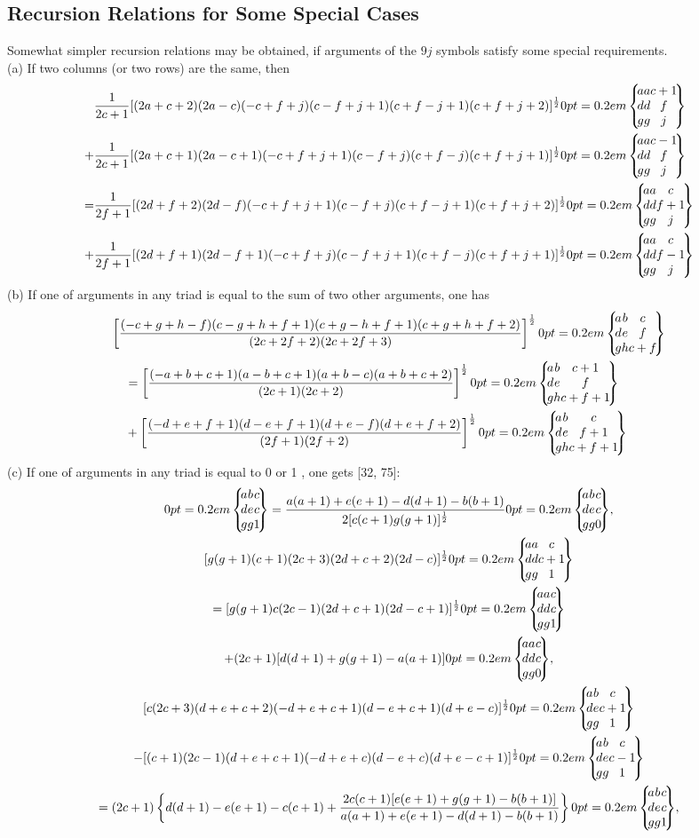 \subsection{Recursion Relations for Some Special Cases}\label{sec:10.5.5}
Somewhat simpler recursion relations may be obtained, if arguments of the $9 j$ symbols satisfy some special requirements.\\
(a) If two columns (or two rows) are the same, then
\begin{align}
& \frac{1}{2 c+1}[(2 a+c+2)(2 a-c)(-c+f+j)(c-f+j+1)(c+f-j+1)(c+f+j+2)]^{\frac{1}{2}}\ninej{a}{a}{c+1}{d}{d}{f}{g}{g}{j}  \notag\\
+ & \frac{1}{2 c+1}[(2 a+c+1)(2 a-c+1)(-c+f+j+1)(c-f+j)(c+f-j)(c+f+j+1)]^{\frac{1}{2}}\ninej{a}{a}{c-1}{d}{d}{f}{g}{g}{j}  \notag\\
= & \frac{1}{2 f+1}[(2 d+f+2)(2 d-f)(-c+f+j+1)(c-f+j)(c+f-j+1)(c+f+j+2)]^{\frac{1}{2}}\ninej{a}{a}{c}{d}{d}{f+1}{g}{g}{j}  \notag\\
+ & \frac{1}{2 f+1}[(2 d+f+1)(2 d-f+1)(-c+f+j)(c-f+j+1)(c+f-j)(c+f+j+1)]^{\frac{1}{2}}\ninej{a}{a}{c}{d}{d}{f-1}{g}{g}{j} \label{eq:10:5:11}
\end{align}
(b) If one of arguments in any triad is equal to the sum of two other arguments, one has \cite{ref045}
\begin{align}
& {\left[\frac{(-c+g+h-f)(c-g+h+f+1)(c+g-h+f+1)(c+g+h+f+2)}{(2 c+2 f+2)(2 c+2 f+3)}\right]^{\frac{1}{2}}\ninej{a}{b}{c}{d}{e}{f}{g}{h}{c+f}}  \notag\\
& \quad=\left[\frac{(-a+b+c+1)(a-b+c+1)(a+b-c)(a+b+c+2)}{(2 c+1)(2 c+2)}\right]^{\frac{1}{2}}\ninej{a}{b}{c+1}{d}{e}{f}{g}{h}{c+f+1}  \notag\\
& \quad+\left[\frac{(-d+e+f+1)(d-e+f+1)(d+e-f)(d+e+f+2)}{(2 f+1)(2 f+2)}\right]^{\frac{1}{2}}\ninej{a}{b}{c}{d}{e}{f+1}{g}{h}{c+f+1} \label{eq:10:5:12}
\end{align}
(c) If one of arguments in any triad is equal to 0 or 1 , one gets [32, 75]:
\begin{gather}
\ninej{a}{b}{c}{d}{e}{c}{g}{g}{1}=\frac{a(a+1)+e(e+1)-d(d+1)-b(b+1)}{2[c(c+1) g(g+1)]^{\frac{1}{2}}}\ninej{a}{b}{c}{d}{e}{c}{g}{g}{0},  \label{eq:10:5:13}\\
{[g(g+1)(c+1)(2 c+3)(2 d+c+2)(2 d-c)]^{\frac{1}{2}}\ninej{a}{a}{c}{d}{d}{c+1}{g}{g}{1}}  \notag\\
=[g(g+1) c(2 c-1)(2 d+c+1)(2 d-c+1)]^{\frac{1}{2}}\ninej{a}{a}{c}{d}{d}{c}{g}{g}{1}  \notag\\
+(2 c+1)[d(d+1)+g(g+1)-a(a+1)]\ninej{a}{a}{c}{d}{d}{c}{g}{g}{0},  \label{eq:10:5:14}\\
{[c(2 c+3)(d+e+c+2)(-d+e+c+1)(d-e+c+1)(d+e-c)]^{\frac{1}{2}}\ninej{a}{b}{c}{d}{e}{c+1}{g}{g}{1}}  \notag\\
-[(c+1)(2 c-1)(d+e+c+1)(-d+e+c)(d-e+c)(d+e-c+1)]^{\frac{1}{2}}\ninej{a}{b}{c}{d}{e}{c-1}{g}{g}{1}  \notag\\
=(2 c+1)\left\{d(d+1)-e(e+1)-c(c+1)+\frac{2 c(c+1)[e(e+1)+g(g+1)-b(b+1)]}{a(a+1)+e(e+1)-d(d+1)-b(b+1)}\right\}\ninej{a}{b}{c}{d}{e}{c}{g}{g}{1}, \label{eq:10:5:15}
\end{gather}
